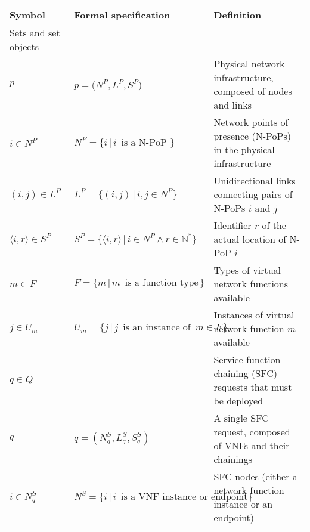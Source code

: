 \small
\begin{tabular}{l l l}\hline
Symbol                               & Formal specification                                                                              & Definition \\\hline
Sets and set objects                 &                                                                                                   & \\
$p$                                  & $p = (N^{P}, L^{P}, S^{P}$)                                                                       & Physical network infrastructure, composed of nodes and links\\
$i \in N^{P}$                        & $N^{P} = \{ i\,\vert\,i\,\mbox{ is a N-PoP }\}$                                                   & Network points of presence (N-PoPs) in the physical infrastructure \\
$(i,j) \in L^{P}$                    & $L^{P} = \{ (i,j)\,\vert\, i,j \in N^{P}\}$                                                       & Unidirectional links connecting pairs of N-PoPs $i$ and $j$ \\
$\langle i, r \rangle \in S^{P}$     & $S^{P} = \{ \langle i, r \rangle\,\vert\, i \in N^{P} \land r \in \mathbb{N}^{*} \}$              & Identifier $r$ of the actual location of N-PoP $i$ \\
$m \in F$                            & $F = \{ m\,\vert\,m\,\mbox{ is a function type}\,\}          $                                    & Types of virtual network functions available\\
$j \in U_{m}$                        & $U_{m} = \{ j\,\vert\,j\,\mbox{ is an instance of }\, m \in F\,\}$                                & Instances of virtual network function $m$ available\\
$q \in Q$                            &                                                                                                   & Service function chaining (SFC) requests that must be deployed\\
$q$                                  & $q = (N^{S}_q, L^{S}_q, S^{S}_q)$                                                                 & A single SFC request, composed of VNFs and their chainings\\
$i \in N^{S}_q$                      & $N^{S} = \{ i\,\vert\,i\,\mbox{ is a VNF instance or endpoint }\}$                                & SFC nodes (either a network function instance or an endpoint)\\

\end{tabular}
